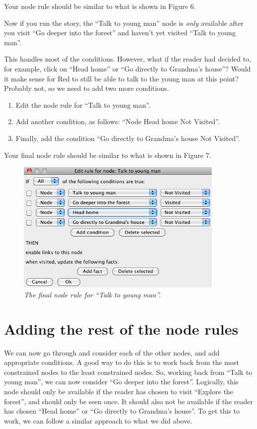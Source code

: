 \documentclass{article}
\begin{document}
Your node rule should be similar to what is shown in Figure 6. 

Now if you run the story, the ``Talk to young man'' node is \textit{only}
available after you visit ``Go deeper into the forest'' and haven't yet
visited ``Talk to young man''.

This handles most of the conditions. However, what if the reader had decided
to, for example, click on ``Head home'' or ``Go directly to Grandma's house''?
Would it make sense for Red to still be able to talk to the young man at this
point? Probably not, so we need to add two more conditions.

\begin{enumerate}
  \item Edit the node rule for ``Talk to young man''.
  \item Add another condition, as follows: ``Node Head home Not
  Visited''.
  \item Finally, add the condition ``Go directly to Grandma's house Not
  Visited''.
\end{enumerate}

Your final node rule should be similar to what is shown in Figure 7.

\begin{figure}[h]
  \centering
  \includegraphics[width=10cm]{images/hypedyn-tutorial-3-figure-7}
  \caption{\textit{The final node rule for ``Talk to young man''.}}
\end{figure} 

\section{Adding the rest of the node rules}

We can now go through and consider each of the other nodes, and add appropriate
conditions. A good way to do this is to work back from the most constrained
nodes to the least constrained nodes. So, working back from ``Talk to young
man'', we can now consider ``Go deeper into the forest''. Logically, this node
should only be available if the reader has chosen to visit ``Explore the
forest'', and should only be seen once. It should also not be available if the
reader has chosen ``Head home'' or ``Go directly to Grandma's house''. To get
this to work, we can follow a similar approach to what we did above.
\end{document}
